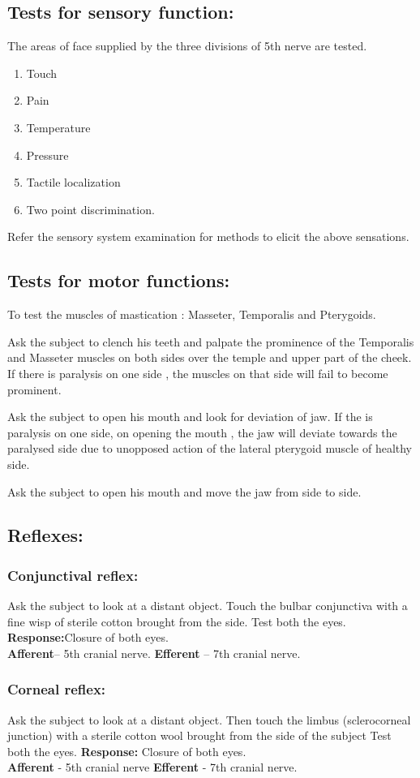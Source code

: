 \documentclass[a4paper,12pt,openany,twoside]{book}
\begin{document}
\subsection*{Tests for sensory function:}
The areas of face supplied by the three divisions of 5th nerve are tested.
\begin{enumerate}
\item{ Touch}
\item{ Pain	}
\item{ Temperature}
\item{ Pressure}
\item{ Tactile localization	}
\item{ Two point discrimination.}
\end{enumerate}
Refer the sensory system examination for methods to elicit the above sensations.
\subsection*{Tests for motor functions:}
To test the muscles of mastication : Masseter, Temporalis and Pterygoids.
\par
Ask the subject to clench his teeth and palpate the prominence of the Temporalis and Masseter muscles on both sides over the temple and upper part of the cheek. If there is paralysis on one side , the muscles on that side will fail to become prominent.
\par
Ask the subject to open his mouth and look for deviation of jaw. If the is paralysis on one side, on opening the mouth , the jaw will deviate towards the paralysed side due to unopposed action of the lateral pterygoid muscle of healthy side.
\par
Ask the subject to open his mouth and move the jaw from side to side.
\subsection*{Reflexes:}
\subsubsection*{Conjunctival reflex:}
	Ask the subject to look at a distant object. Touch the bulbar conjunctiva with a fine wisp of sterile cotton brought from the side. Test both the eyes.
\textbf{Response:}Closure of both eyes.\\ 
\textbf{Afferent}– 5th cranial nerve. \textbf{Efferent} – 7th cranial nerve.
\subsubsection*{Corneal reflex:}
Ask the subject to look at a distant object. Then touch the limbus (sclerocorneal junction) with a sterile cotton wool brought from the side of the subject Test both the eyes.
\textbf{Response:} Closure of both eyes.\\
\textbf{Afferent} - 5th cranial nerve
\textbf{Efferent} - 7th  cranial nerve.
\end{document}
